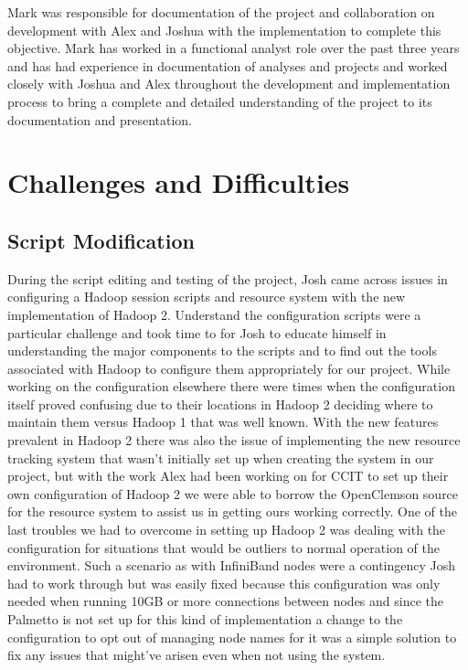 \documentclass[conference]{IEEEtran}
\begin{document}
			Mark was responsible for documentation of the project and collaboration on development with Alex and Joshua with the implementation to complete this objective.  Mark has worked in a functional analyst role over the past three years and has had experience in documentation of analyses and projects and worked closely with Joshua and Alex throughout the development and implementation process to bring a complete and detailed understanding of the project to its documentation and presentation.

		\section{Challenges and Difficulties}
			\subsection{Script Modification}
				During the script editing and testing of the project, Josh came across issues in configuring a Hadoop session scripts and resource system with the new implementation of Hadoop 2.  Understand the configuration scripts were a particular challenge and took time to for Josh to educate himself in understanding the major components to the scripts and to find out the tools associated with Hadoop to configure them appropriately for our project.  While working on the configuration elsewhere there were times when the configuration itself proved confusing due to their locations in Hadoop 2 deciding where to maintain them versus Hadoop 1 that was well known.  With the new features prevalent in Hadoop 2 there was also the issue of implementing the new resource tracking system that wasn’t initially set up when creating the system in our project, but with the work Alex had been working on for CCIT to set up their own configuration of Hadoop 2 we were able to borrow the OpenClemson source\cite{openclemson} for the resource system to assist us in getting ours working correctly.  One of the last troubles we had to overcome in setting up Hadoop 2 was dealing with the configuration for situations that would be outliers to normal operation of the environment.  Such a scenario as with InfiniBand nodes were a contingency Josh had to work through but was easily fixed because this configuration was only needed when running 10GB or more connections between nodes and since the Palmetto is not set up for this kind of implementation a change to the configuration to opt out of managing node names for it was a simple solution to fix any issues that might’ve arisen even when not using the system.
\end{document}
